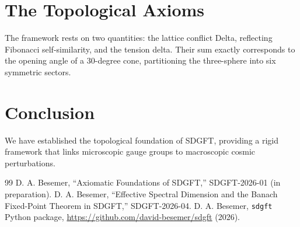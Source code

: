 \documentclass[amsmath,amssymb,aps,prd,twocolumn,superscriptaddress,nofootinbib]{revtex4-2}
\begin{document}
\section{The Topological Axioms}
The framework rests on two quantities: the lattice conflict Delta, reflecting Fibonacci self-similarity, and the tension delta. Their sum exactly corresponds to the opening angle of a 30-degree cone, partitioning the three-sphere into six symmetric sectors.

\section{Conclusion}
We have established the topological foundation of SDGFT, providing a rigid framework that links microscopic gauge groups to macroscopic cosmic perturbations.



\begin{thebibliography}{99}
 D. A. Besemer, ``Axiomatic Foundations of SDGFT,'' SDGFT-2026-01 (in preparation).
 D. A. Besemer, ``Effective Spectral Dimension and the Banach Fixed-Point Theorem in SDGFT,'' SDGFT-2026-04.
 D. A. Besemer, \texttt{sdgft} Python package, \url{https://github.com/david-besemer/sdgft} (2026).
\end{thebibliography}
\end{document}
